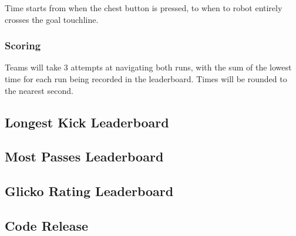Time starts from when the chest button is pressed, to when to robot entirely crosses the goal touchline.

\subsubsection{Scoring}
Teams will take 3 attempts at navigating both runs, with the sum of the lowest time for each
run being recorded in the leaderboard. Times will be rounded to the nearest second.

\subsection{Longest Kick Leaderboard}

\subsection{Most Passes Leaderboard}

\subsection{Glicko Rating Leaderboard}


\subsection{Code Release}
